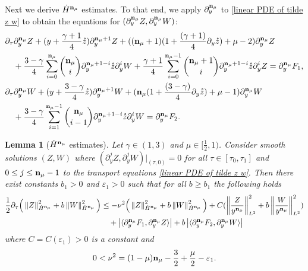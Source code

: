 \documentclass{article}
\newcommand{\norm}[1]{\left\lVert#1\right\rVert}
\newcommand{\ga}{\gamma}
\newcommand{\pa}{\partial}
\newcommand\eps{\varepsilon}
\def\be{\begin{equation}}
\def\ee{\end{equation}}
\def\beqa{\begin{equation}\begin{aligned}}
\def\eeqa{\end{aligned}\end{equation}}
\def\espz{Z}
\def\espw{W}
\def\ndmu{{\bf{n}_{\mu}}}
\numberwithin{equation}{section}
\newtheorem{lemma}[theorem]{Lemma}
\begin{document}
Next we derive $\dot H^\ndmu$ estimates. To that end, we apply $\pa_y^{\ndmu}$ to \eqref{linear PDE of tilde z w} to obtain the equations for $(\pa_y^\ndmu \espz, \pa_y^\ndmu \espw)$: 
\be\label{linear PDE of der of tilde z w}
	\begin{aligned}
	&\partial_\tau\pa_y^{\ndmu} \espz + (y+\frac{\ga+1}{4}\mathring z ) \partial_y^{\ndmu+1} \espz + ((\ndmu+1) (1+ \frac{(\ga+1)}{4}\partial_y \mathring z)+\mu-2)\pa_y^{\ndmu}\espz  \\
&\quad +\frac{3-\ga}{4}\sum_{i=0}^{\ndmu} \binom{\ndmu}{i} \pa_y^{\ndmu+1-i} \mathring z \pa_y^{i} \espw +\frac{\ga+1}{4}\sum_{i=0}^{\ndmu-1} \binom{\ndmu+1}{i} \pa_y^{\ndmu+1-i} \mathring z \pa_y^i \espz	
= \pa_y^\ndmu F_1  ,\\
&		\partial_\tau \pa_y^{\ndmu}\espw + (y+\frac{3-\ga}{4}\mathring z ) \partial_y^{\ndmu+1} \espw + ( \ndmu ( 1+\frac{(3-\ga)}{4} \pa_y \mathring z)+\mu-1)\pa_y^{\ndmu}\espw   \\
 & \quad    +\frac{3-\ga}{4} \sum_{i=1}^{\ndmu-1} \binom{\ndmu}{i-1} \pa_y^{\ndmu+1-i} \mathring z \pa_y^{i} \espw 
 = \pa_y^\ndmu F_2.
	\end{aligned}
\ee
\begin{lemma}[$\dot H^{\ndmu}$ estimates] \label{linear H^n estimates}
Let $\ga\in(1,3)$ and $\mu\in[\frac12,1)$. Consider smooth solutions $(Z,W)$ where $(\pa_y^j Z,\pa_y^jW)|_{(\tau,0)} =0$ for all $\tau\in [\tau_0,\tau_1]$ and $0\le j\le \ndmu-1$ to the transport equations \eqref{linear PDE of tilde z w}. 
	Then there exist constants $b_1 >0$ and $\eps_1>0$  such that for all $b\ge b_1$ the following holds
\beqa
\begin{split}
	\frac12\pa_\tau \Big( \norm{\espz}_{\dot H^{\ndmu}}^2+b \norm{\espw}_{\dot H^{\ndmu}}^2 \Big)
	&\le  -\nu^2 \Big( \norm{\espz}_{\dot H^{\ndmu}}^2+ b\norm{\espw}_{\dot H^{\ndmu}} ^2\Big) +C (\norm{\frac{\espz}{y^{\ndmu}}}_{L^2}^2 + b\norm{\frac{\espw}{y^{\ndmu}}}_{L^2}^2) \\
    &\quad +\left|\langle \pa_y^\ndmu F_1, \pa_y^\ndmu \espz \rangle \right| +b \left|\langle \pa_y^\ndmu F_2, \pa_y^\ndmu \espw \rangle \right| %
\end{split}
\eeqa	
where  $C=C(\eps_1)>0$ is a constant and 
\[
0 < \nu^2 =  (1-\mu)\ndmu - \frac32 + \frac{\mu}{2}  -  \eps_1.
\] 
\end{lemma}
\end{document}

